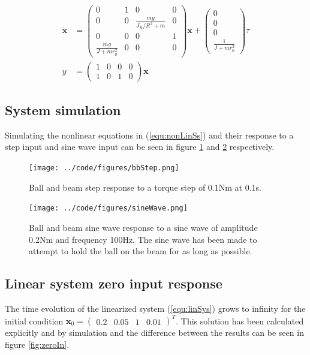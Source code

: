 \documentclass[a4paper, titlepage]{article}
\begin{document}
\begin{equation}
\begin{split}
\dot{\textbf{x}} &= 
\begin{pmatrix}
0 & 1 & 0 & 0 \\
0 & 0 & \frac{mg}{J_R/R^2 + m} & 0 \\
0 & 0 & 0 & 1 \\
\frac{mg}{J + mr_0^2} & 0 & 0 & 0
\end{pmatrix}\textbf{x} + \begin{pmatrix}
0 \\ 0 \\ 0 \\ \frac{1}{J + mr_0^2}
\end{pmatrix}\tau \\
y &= \begin{pmatrix}
1 & 0 & 0 & 0 \\
1 & 0 & 1 & 0
\end{pmatrix}\textbf{x}
\end{split}
\label{equ:linSys}
\end{equation}


\subsection{System simulation}
Simulating the nonlinear equations in (\ref{equ:nonLinSs}) and their response to a step input and sine wave input can be seen in figure \ref{fig:bbStep} and \ref{fig:sineWave} respectively.

\begin{figure}[H]
\center
\texttt{[image: ../code/figures/bbStep.png]}
\caption{Ball and beam step response to a torque step of 0.1Nm at 0.1s.}
\label{fig:bbStep}
\end{figure}

\begin{figure}[H]
\center
\texttt{[image: ../code/figures/sineWave.png]}
\caption{Ball and beam sine wave response to a sine wave of amplitude 0.2Nm and frequency 100Hz. The sine wave has been made to attempt to hold the ball on the beam for as long as possible.}
\label{fig:sineWave}
\end{figure}

\subsection{Linear system zero input response}
The time evolution of the linearized system (\ref{equ:linSys}) grows to infinity for the initial condition $\textbf{x}_0 = \begin{pmatrix} 0.2 & 0.05 & 1 & 0.01 \end{pmatrix}^T$.
This solution has been calculated explicitly and by simulation and the difference between the results can be seen in figure \ref{fig:zeroIn}.
\end{document}
